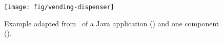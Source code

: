 \begin{figure}[!ht]
\begin{center}
\texttt{[image: fig/vending-dispenser]}
\caption{\label{fig:vending}Example adapted from~\cite{Orso01UCMS}
of a Java application () and one component
().}
\end{center}
\end{figure}

